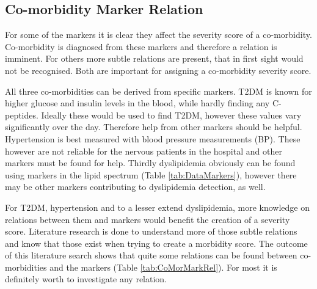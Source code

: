\documentclass[10pt,a4paper]{report}
\begin{document}
	\subsection{Co-morbidity Marker Relation}
	\label{subsec:CoMorMarkRel}
	
	For some of the markers it is clear they affect the severity score of a co-morbidity. Co-morbidity is diagnosed from these markers and therefore a relation is imminent. For others more subtle relations are present, that in first sight would not be recognised. Both are important for assigning a co-morbidity severity score.
	
	All three co-morbidities can be derived from specific markers. T2DM is known for higher glucose and insulin levels in the blood, while hardly finding any C-peptides. Ideally these would be used to find T2DM, however these values vary significantly over the day. Therefore help from other markers should be helpful. Hypertension is best measured with blood pressure measurements (BP). These however are not reliable for the nervous patients in the hospital and other markers must be found for help. Thirdly dyslipidemia obviously can be found using markers in the lipid spectrum (Table \ref{tab:DataMarkers}), however there may be other markers contributing to dyslipidemia detection, as well.
	
	For T2DM, hypertension and to a lesser extend dyslipidemia, more knowledge on relations between them and markers would benefit the creation of a severity score. Literature research is done to understand more of those subtle relations and know that those exist when trying to create a morbidity score. The outcome of this literature search shows that quite some relations can be found between co-morbidities and the markers (Table \ref{tab:CoMorMarkRel}). For most it is definitely worth to investigate any relation.
	
\end{document}
